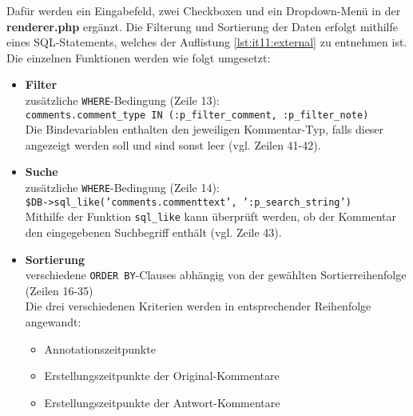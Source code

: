Dafür werden ein Eingabefeld, zwei Checkboxen und ein Dropdown-Menü in der \textbf{renderer.php} ergänzt. Die Filterung und Sortierung der Daten erfolgt mithilfe eines SQL-Statements, welches der Auflistung \ref{lst:it11:external} zu entnehmen ist. Die einzelnen Funktionen werden wie folgt umgesetzt:

\begin{itemize}
\item \textbf{Filter}\\
zusätzliche \texttt{WHERE}-Bedingung (Zeile 13):\\
\texttt{comments.comment_type IN (:p_filter_comment, :p_filter_note)}\\
Die Bindevariablen enthalten den jeweiligen Kommentar-Typ, falls dieser angezeigt werden soll und sind sonst leer (vgl. Zeilen 41-42).
\item \textbf{Suche}\\
zusätzliche \texttt{WHERE}-Bedingung (Zeile 14):\\
\texttt{\$DB->sql_like('comments.commenttext', ':p_search_string')}\\
Mithilfe der Funktion \texttt{sql_like} kann überprüft werden, ob der Kommentar den eingegebenen Suchbegriff enthält (vgl. Zeile 43).
\item \textbf{Sortierung}\\
verschiedene \texttt{ORDER BY}-Clauses abhängig von der gewählten Sortierreihenfolge (Zeilen 16-35)\\
Die drei verschiedenen Kriterien werden in entsprechender Reihenfolge angewandt:
\begin{itemize}
\item Annotationszeitpunkte
\item Erstellungszeitpunkte der Original-Kommentare
\item Erstellungszeitpunkte der Antwort-Kommentare
\end{itemize}
\end{itemize}


